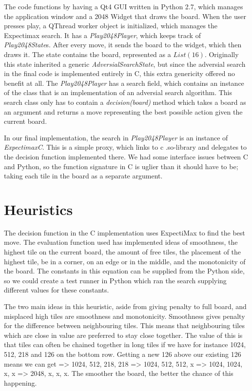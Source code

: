The code functions by having a Qt4 GUI written in Python 2.7, which
manages the application window and a 2048 Widget that draws the board.
When the user presses play, a QThread worker object is initialized, which
manages the Expectimax search. It has a \emph{Play2048Player}, which keeps track of
\emph{Play2048State}s. After every move, it sends the board to the widget, which then draws it.
The state contains the board, represented as a \(List(16)\). Originally this
state inherited a generic \emph{AdversialSearchState}, but since the adversial
search in the final code is implemented entirely in C, this extra
genericity offered no benefit at all. The \emph{Play2048Player} has a search field, which
contains an instance of the class that is an implementation of an adversial search algorithm. This
search class only has to contain a \emph{decision(board)} method which takes a board
as an argument and returns a move representing the best possible action
given the current board.

In our final implementation, the search in \emph{Play2048Player} is an instance of
\emph{ExpectimaxC}. This is a simple proxy, which links to c .so-library and delegates
to the decision function implemented there. We had some interface issues between
C and Python, so the function signature in C is uglier than it should have to
be; taking each tile in the board as a separate argument.



\section{Heuristics}

The decision function in the C implementation uses ExpectiMax to find the best move.
The evaluation function used has implemented ideas of smoothness, the highest tile
on the current board, the amount of free tiles, the placement of the highest tile,
be in a corner, on an edge or in the middle, and the monotonicity of the board.
The constants in this equation can be supplied from the Python side, so we
could create a test runner in Python which ran the search supplying different
values for these constants.

The two main ideas in this heuristic, aside from giving penalty to full board, and
misplaced high tiles are smoothness and monotonicity. Smoothness gives penalty
for the difference between neighbouring tiles. This means that neighbouring tiles
which are close in value are preferred to stay close together. The value of this is
that tiles can often be chained together in long tiles if we have for instance
1024, 512, 218 and 126 on the bottom row. Getting a new 126 above our existing 126
means we can get => 1024, 512, 218, 218 => 1024, 512, 512, x => 1024, 1024, x, x =>
2048, x, x, x. The smoother the board, the better the chance of this happening.

